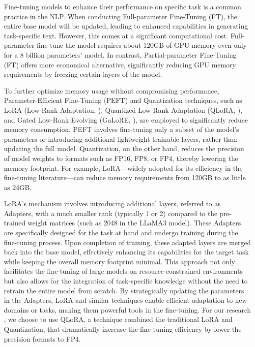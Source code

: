 Fine-tuning models to enhance their performance on specific task is a common practice in the NLP. When conducting Full-parameter Fine-Tuning (FT), the entire base model will be updated, leading to enhanced capabilities in generating task-specific text. However, this comes at a significant computational cost.  Full-parameter fine-tune the model requires about 120GB of GPU memory even only for a 8 billion parameters' model. In contrast, Partial-parameter Fine-Tuning (FT) offers more economical alternative, significantly reducing GPU memory requirements by freezing certain layers of the model.



To further optimize memory usage without compromising performance, Parameter-Efficient Fine-Tuning (PEFT) and Quantization techniques, such as LoRA (Low-Rank Adaptation, \cite{hu2021lora}), Quantized Low-Rank Adaptation (QLoRA, \cite{dettmers2024qlora}), and Gated Low-Rank Evolving (GaLoRE, \cite{zhao2024galore}), are employed to significantly reduce memory consumption. PEFT involves fine-tuning only a subset of the model's parameters or introducing additional lightweight trainable layers, rather than updating the full model. Quantization, on the other hand, reduces the precision of model weights to formats such as FP16, FP8, or FP4, thereby lowering the memory footprint. For example, LoRA—widely adopted for its efficiency in the fine-tuning literature—can reduce memory requirements from 120GB to as little as 24GB.



LoRA's mechanism involves introducing additional layers, referred to as Adapters, with a much smaller rank (typically 1 or 2) compared to the pre-trained weight matrices (such as 2048 in the LLaMA3 model). These Adapters are specifically designed for the task at hand and undergo training during the fine-tuning process. Upon completion of training, these adapted layers are merged back into the base model, effectively enhancing its capabilities for the target task while keeping the overall memory footprint minimal. This approach not only facilitates the fine-tuning of large models on resource-constrained environments but also allows for the integration of task-specific knowledge without the need to retrain the entire model from scratch. By strategically updating the parameters in the Adapters, LoRA and similar techniques enable efficient adaptation to new domains or tasks, making them powerful tools in the fine-tuning. For our research , we choose to use QLoRA, a technique combined the traditional LoRA and Quantization, that dramatically increase the fine-tuning efficiency by lower the precision formats to FP4.



